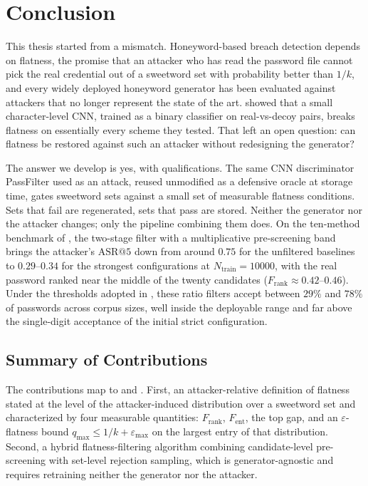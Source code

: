 \chapter{Conclusion}
\label{ch:conclusion}

This thesis started from a mismatch. Honeyword-based breach detection
depends on flatness, the promise that an attacker who has read the
password file cannot pick the real credential out of a sweetword set
with probability better than $1/k$, and every widely deployed honeyword
generator has been evaluated against attackers that no longer represent
the state of the art. \textcite{dani2024passfilter} showed that a small
character-level CNN, trained as a binary classifier on real-vs-decoy
pairs, breaks flatness on essentially every scheme they tested. That
left an open question: can flatness be restored against such an attacker
without redesigning the generator?

The answer we develop is yes, with qualifications. The same CNN
discriminator PassFilter used as an attack, reused unmodified as a
defensive oracle at storage time, gates sweetword sets against a small
set of measurable flatness conditions. Sets that fail are regenerated,
sets that pass are stored. Neither the generator nor the attacker
changes; only the pipeline combining them does. On the ten-method
benchmark of , the two-stage filter with a
multiplicative pre-screening band brings the attacker's
$\mathrm{ASR}@5$ down from around $0.75$ for the unfiltered baselines to
$0.29$--$0.34$ for the strongest configurations at
$N_{\text{train}} = 10000$, with the real password ranked near the
middle of the twenty candidates ($F_{\text{rank}} \approx 0.42$--$0.46$).
Under the thresholds adopted in ,
these ratio filters accept between $29\%$ and $78\%$ of passwords across
corpus sizes, well inside the deployable range and far above the
single-digit acceptance of the initial strict configuration.

\section{Summary of Contributions}

The contributions map to  and . First,
an attacker-relative definition of flatness stated at the level of the
attacker-induced distribution over a sweetword set and characterized by
four measurable quantities: $F_{\text{rank}}$, $F_{\text{ent}}$, the top
gap, and an $\varepsilon$-flatness bound
$q_{\max} \le 1/k + \varepsilon_{\max}$ on the largest entry of that
distribution. Second, a hybrid flatness-filtering algorithm combining
candidate-level pre-screening with set-level rejection sampling, which
is generator-agnostic and requires retraining neither the generator nor
the attacker.

